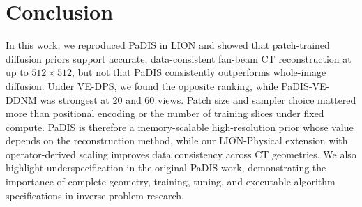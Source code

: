 \ifpdf
    \graphicspath{{Sections/6_conclusions_figs/Raster/}{Sections/6_conclusions_figs/PDF/}{Sections/6_conclusions_figs/}}
\else
    \graphicspath{{Sections/6_conclusions_figs/Vector/}{Sections/6_conclusions_figs/}}
\fi

\chapter{Conclusion}
\label{sec:conclusion}

In this work, we reproduced PaDIS in LION and showed that patch-trained diffusion priors support accurate, data-consistent fan-beam CT reconstruction at up to $512\times512$, but not that PaDIS consistently outperforms whole-image diffusion. Under VE-DPS, we found the opposite ranking, while PaDIS-VE-DDNM was strongest at 20 and 60 views. Patch size and sampler choice mattered more than positional encoding or the number of training slices under fixed compute. PaDIS is therefore a memory-scalable high-resolution prior whose value depends on the reconstruction method, while our LION-Physical extension with operator-derived scaling improves data consistency across CT geometries. We also highlight underspecification in the original PaDIS work, demonstrating the importance of complete geometry, training, tuning, and executable algorithm specifications in inverse-problem research.
